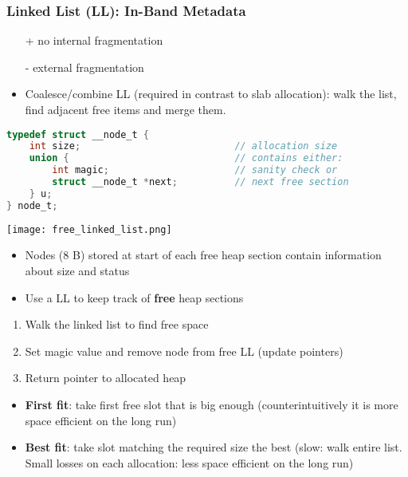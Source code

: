 \subsubsection{Linked List (LL): In-Band Metadata}
\begin{itemize}
    \item [+] no internal fragmentation
    \item [-] external fragmentation
\end{itemize}

\newpar{}

\begin{itemize}
    \item Coalesce/combine LL (required in contrast to slab allocation): walk the list, find adjacent free items and merge them.
\end{itemize}

\newpar{}
\begin{lstlisting}[language={C}]
typedef struct __node_t {
    int size;                           // allocation size
    union {                             // contains either:
        int magic;                      // sanity check or
        struct __node_t *next;          // next free section
    } u;
} node_t;         
\end{lstlisting}

\texttt{[image: free\_linked\_list.png]}

\begin{itemize}
    \item Nodes (8 B) stored at start of each free heap section contain information about size and status
    \item Use a LL to keep track of \textbf{free} heap sections
\end{itemize}

\newpar{}
\begin{enumerate}
    \item Walk the linked list to find free space
    \item Set magic value and remove node from free LL (update pointers)
    \item Return pointer to allocated heap
\end{enumerate}

\newpar{}
\begin{itemize}
    \item \textbf{First fit}: take first free slot that is big enough (counterintuitively it is more space efficient on the long run)
    \item \textbf{Best fit}: take slot matching the required size the best (slow: walk entire list. Small losses on each allocation: less space efficient on the long run)
\end{itemize}

